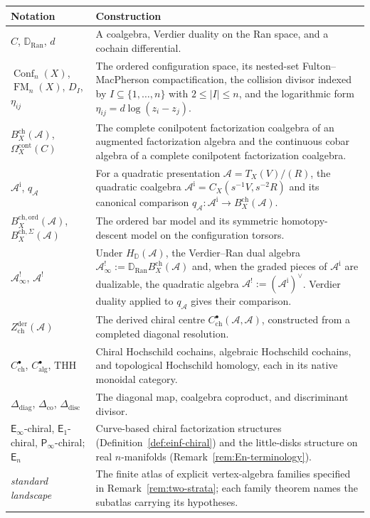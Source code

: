 \documentclass[11pt]{memoir}
\newcommand{\Eone}{\mathsf{E}_1}
\newcommand{\En}{\mathsf{E}_n}
\newcommand{\Einf}{\mathsf{E}_{\infty}}
\newcommand{\Pinf}{\mathsf{P}_{\infty}}
\newcommand{\cA}{\mathcal{A}}
\begin{document}
\begin{center}
\small
\renewcommand{\arraystretch}{1.22}
\begin{tabular}{@{}p{}p{}@{}}
\toprule
\textbf{Notation} & \textbf{Construction}\\
\midrule
$C$, $\mathbb D_{\operatorname{Ran}}$, $d$ &
A coalgebra, Verdier duality on the Ran space, and a cochain
differential.\\
$\operatorname{Conf}_n(X)$,
$\operatorname{FM}_n(X)$, $D_I$, $\eta_{ij}$ &
The ordered configuration space, its nested-set
Fulton--MacPherson compactification, the collision divisor indexed by
$I\subseteq\{1,\ldots,n\}$ with $2\leq |I|\leq n$, and the
logarithmic form
$\eta_{ij}=d\log(z_i-z_j)$.\\
$B_X^{\mathrm{ch}}(\cA)$,
$\Omega_X^{\mathrm{cont}}(C)$ &
The complete conilpotent factorization coalgebra of an augmented
factorization algebra and the continuous cobar algebra of a complete
conilpotent factorization coalgebra.\\
$\cA^{\mathrm i}$, $q_\cA$ &
For a quadratic presentation $\cA=T_X(V)/(R)$, the quadratic
coalgebra $\cA^{\mathrm i}=C_X(s^{-1}V,s^{-2}R)$ and its canonical comparison
$q_\cA\colon\cA^{\mathrm i}\to B_X^{\mathrm{ch}}(\cA)$.\\
$B_X^{\mathrm{ch},\mathrm{ord}}(\cA)$,
$B_X^{\mathrm{ch},\Sigma}(\cA)$ &
The ordered bar model and its symmetric homotopy-descent model on the
configuration torsors.\\
$\cA^!_\infty$, $\cA^!$ &
Under $H_{\mathbb D}(\cA)$, the Verdier--Ran dual algebra
$\cA^!_\infty:=\mathbb D_{\operatorname{Ran}}B_X^{\mathrm{ch}}(\cA)$
and, when the graded pieces of $\cA^{\mathrm i}$ are dualizable, the
quadratic algebra $\cA^!:=(\cA^{\mathrm i})^\vee$.  Verdier duality
applied to $q_\cA$ gives their comparison.\\
$Z^{\mathrm{der}}_{\mathrm{ch}}(\cA)$ &
The derived chiral centre
$C^\bullet_{\mathrm{ch}}(\cA,\cA)$, constructed from a completed
diagonal resolution.\\
$C^\bullet_{\mathrm{ch}}$, $C^\bullet_{\mathrm{alg}}$,
$\mathrm{THH}$ &
Chiral Hochschild cochains, algebraic Hochschild cochains, and
topological Hochschild homology, each in its native monoidal
category.\\
$\Delta_{\mathrm{diag}}$, $\Delta_{\mathrm{co}}$,
$\Delta_{\mathrm{disc}}$ &
The diagonal map, coalgebra coproduct, and discriminant divisor.\\
$\Einf$-chiral, $\Eone$-chiral, $\Pinf$-chiral; $\En$ &
Curve-based chiral factorization structures
(Definition~\ref{def:einf-chiral}) and the little-disks structure on
real $n$-manifolds (Remark~\ref{rem:En-terminology}).\\
\textit{standard landscape} &
The finite atlas of explicit vertex-algebra families specified in
Remark~\ref{rem:two-strata}; each family theorem names the subatlas
carrying its hypotheses.\\
\bottomrule
\end{tabular}
\end{center}
\end{document}
